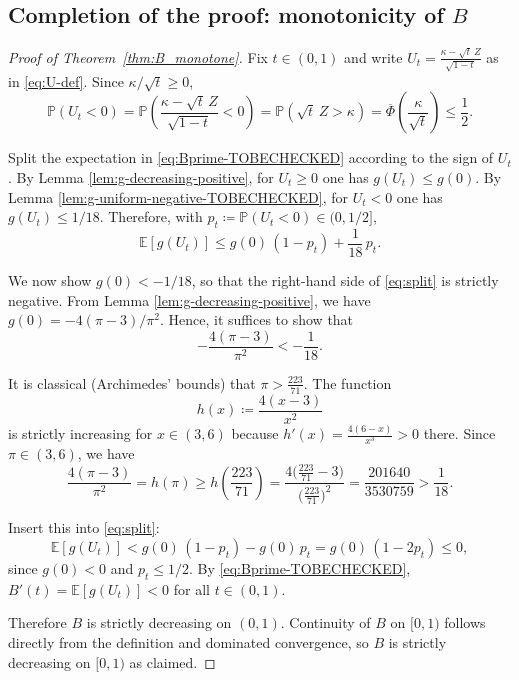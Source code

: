 \documentclass[11pt]{article}
\begin{document}
\subsection{Completion of the proof: monotonicity of $B$}

\begin{proof}[Proof of Theorem~\ref{thm:B_monotone}]
Fix $t\in(0,1)$ and write $U_t=\frac{\kappa-\sqrt{t}\,Z}{\sqrt{1-t}}$ as in \eqref{eq:U-def}. Since  $\kappa/\sqrt{t}\geq 0$,
\[
\mathbb{P}(U_t<0)=\mathbb{P}\!\left(\frac{\kappa-\sqrt{t}\,Z}{\sqrt{1-t}}<0\right)
=\mathbb{P}(\sqrt{t}\,Z>\kappa)
=\overline{\Phi}\!\left(\frac{\kappa}{\sqrt{t}}\right)
\leq \frac{1}{2}.
\]

Split the expectation in \eqref{eq:Bprime-TOBECHECKED} according to the sign of $U_t$.
By Lemma \ref{lem:g-decreasing-positive}, for $U_t\ge 0$ one has $g(U_t)\le g(0)$.
By Lemma \ref{lem:g-uniform-negative-TOBECHECKED}, for $U_t<0$ one has $g(U_t)\le 1/18$.
Therefore, with $p_t\coloneqq \mathbb{P}(U_t<0)\in(0,1/2]$,
\begin{equation}\label{eq:split}
\mathbb{E}[g(U_t)]
\le g(0)\,(1-p_t) + \frac{1}{18}\,p_t.
\end{equation}

We now show $g(0)< -1/18$, so that the right-hand side of \eqref{eq:split} is strictly negative.
From Lemma \ref{lem:g-decreasing-positive}, we have $g(0)=-{4(\pi-3)}/{\pi^2}.$ Hence, it suffices to show that 
\begin{equation}\label{eq: pi-estimate-TOBECHECKED}
    -\frac{4(\pi-3)}{\pi^2}<-\frac{1}{18}.
\end{equation}

It is classical (Archimedes' bounds) that $\pi>\frac{223}{71}$. The function
\[
h(x)\coloneqq \frac{4(x-3)}{x^2}
\]
is strictly increasing for $x\in(3,6)$ because $h'(x)=\frac{4(6-x)}{x^3}>0$ there.
Since $\pi\in(3,6)$, we have
\[
\frac{4(\pi-3)}{\pi^2}=h(\pi)\ge h\!\left(\frac{223}{71}\right)
=\frac{4\bigl(\frac{223}{71}-3\bigr)}{\bigl(\frac{223}{71}\bigr)^2}
=\frac{201640}{3530759}
>\frac{1}{18}.
\]

Insert this into \eqref{eq:split}:
\[
\mathbb{E}[g(U_t)]
< g(0)\,(1-p_t) - g(0)\,p_t
= g(0)\,(1-2p_t)
\leq 0,
\]
since $g(0)<0$ and $p_t\leq 1/2$. By \eqref{eq:Bprime-TOBECHECKED}, $B'(t)=\mathbb{E}[g(U_t)]<0$ for all $t\in(0,1)$.

Therefore $B$ is strictly decreasing on $(0,1)$. Continuity of $B$ on $[0,1)$ follows directly
from the definition and dominated convergence, so $B$ is strictly decreasing on $[0,1)$ as claimed.
\end{proof}
\end{document}

